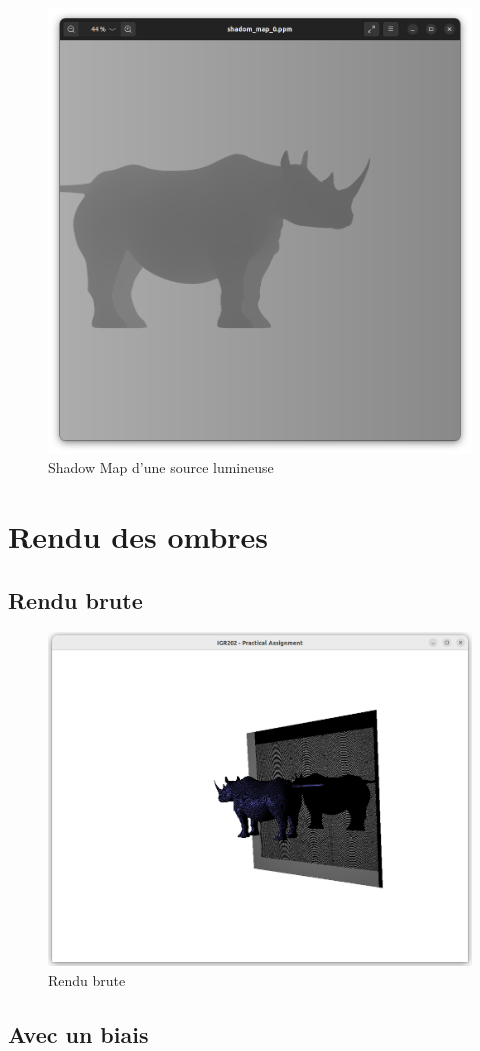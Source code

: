 \documentclass{article}
\begin{document}
\begin{figure}[h]
    \centering
    \includegraphics[width=0.5\linewidth]{images/depthMap.png}
    \caption{Shadow Map d'une source lumineuse}
    \label{fig:depthMap}
\end{figure}

\leavevmode
\newline


\section{Rendu des ombres}

\subsection{Rendu brute}

\begin{figure}[h]
    \centering
    \includegraphics[width=0.5\linewidth]{images/raw.png}
    \caption{Rendu brute}
    \label{fig:raw}
\end{figure}

\newpage

\subsection{Avec un biais}
\end{document}
